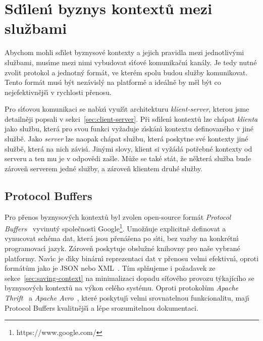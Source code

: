 \section{Sd\'{\i}len\'{\i} byznys kontextů mezi službami}

Abychom mohli sd\'{\i}let byznysové kontexty a jejich pravidla
mezi jednotliv\'ymi službami, mus\'{\i}me mezi nimi vybudovat
s\'{\i}ťové komunikačn\'{\i} kanály. Je tedy nutné zvolit protokol
a jednotn\'y formát, ve kterém spolu budou služby komunikovat.
Tento formát mus\'{\i} b\'yt nezávisl\'y na platformě a ideálně
by měl b\'yt co nejefektivnějš\'{\i} v rychlosti přenosu.

Pro s\'{\i}ťovou komunikaci se nab\'{\i}z\'{\i} využ\'{\i}t architekturu
\textit{klient-server}, kterou jsme detailněji popsali
v sekci~\ref{sec:client-server}. Při sd\'{\i}len\'{\i} kontextů
lze chápat \textit{klienta} jako službu, která pro svou funkci
vyžaduje z\'{\i}skán\'{\i} kontextu definovaného v jiné službě.
Jako \textit{server} lze naopak chápat službu, která poskytne
své kontexty jiné službě, která na nich závis\'{\i}. Jin\'ymi slovy,
klient si vyžádá potřebné kontexty od serveru a ten mu je v
odpovědi zašle. Může se také stát, že některá služba bude zároveň
serverem jedné služby, a zároveň klientem druhé služby.

\subsection{Protocol Buffers}

Pro přenos byznysov\'ych kontextů byl zvolen open-source formát
\textit{Protocol Buffers}~\cite{protobuf}\cite{varda2008protocol}
vyvinut\'y společnost\'{\i} Google\footnote{https://www.google.com/}.
Umožňuje explicitně definovat a vynucovat schéma dat,
která jsou přenášena po s\'{\i}ti, bez vazby na konkrétn\'{\i} programovac\'{\i}
jazyk. Zároveň poskytuje obslužné knihovny pro naše vybrané platformy.
Nav\'{\i}c je d\'{\i}ky binárn\'{\i} reprezentaci dat v přenosu velmi efektivn\'{\i},
oproti formátům jako je \gls{JSON} nebo \gls{XML}~\cite{maeda2012performance}.
Tím splňujeme i požadavek ze sekce~\ref{sec:saving-context} na minimalizaci dopadu
síťového provozu týkajícího se byznysových kontextů na výkon celého systému.
Oproti protokolům \textit{Apache Thrift}~\cite{thrift}
a \textit{Apache Avro}~\cite{avro}, které poskytuj\'{\i}
velmi srovnatelnou funkcionalitu, maj\'{\i} Protocol Buffers
kvalitnějš\'{\i} a lépe srozumitelnou dokumentaci.

